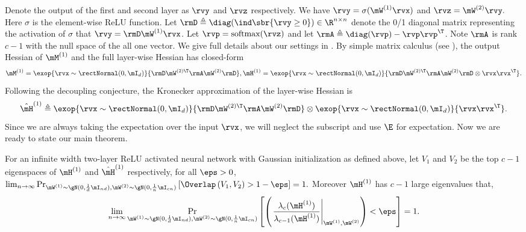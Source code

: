 Denote the output of the first and second layer as $\rvy$ and $\rvz$ respectively. We have $\rvy = \sigma(\mW^{(1)}\rvx)$ and $\rvz = \mW^{(2)}\rvy.$ Here $\sigma$ is the element-wise ReLU function.
Let $\rmD\triangleq\diag(\ind\sbr{\rvy\geq 0})\in\R^{n\times n}$ denote the 0/1 diagonal matrix representing the activation of $\sigma$ that $\rvy=\rmD\mW^{(1)}\rvx$.
Let $\rvp=\mbox{softmax}(\rvz)$ and let $\rmA\triangleq\diag(\rvp)-\rvp\rvp^\T$. Note $\rmA$ is rank $c-1$ with the null space of the all one vector.  We give full details about our settings in .
By simple matrix calculus (see ), the output Hessian of $\mM^{(1)}$ and the full layer-wise Hessian has closed-form
\begin{equation}
    \mM^{(1)} = \exop{\rvx\sim \rectNormal(0, \mI_d)}{\rmD\mW^{(2)\T}\rmA\mW^{(2)}\rmD}, \mH^{(1)} = \exop{\rvx\sim \rectNormal(0, \mI_d)}{\rmD\mW^{(2)\T}\rmA\mW^{(2)}\rmD\otimes \rvx\rvx^\T}.
\end{equation}
Following the decoupling conjecture, the Kronecker approximation of the layer-wise Hessian is \begin{equation}
    \hat\mH^{(1)} \triangleq \exop{\rvx\sim \rectNormal(0, \mI_d)}{\rmD\mW^{(2)\T}\rmA\mW^{(2)}\rmD}\otimes \exop{\rvx\sim \rectNormal(0, \mI_d)}{\rvx\rvx^\T}.
\end{equation}
Since we are always taking the expectation over the input $\rvx$, we will neglect the subscript and use $\E$ for expectation. Now we are ready to state our main theorem.

\begin{theorem}
\label{thm:main-full}
For an infinite width two-layer ReLU activated neural network with Gaussian initialization as defined above, let $V_1$ and $V_2$ be the top $c-1$ eigenspaces of $\mH^{(1)}$ and $\hat\mH^{(1)}$ respectively, for all $\eps>0$, 
$
    \lim_{n\to\infty}\mathop{\Pr}_{\mW^{(1)}\sim\gN(0,\frac{1}{d}\mI_{nd}), \mW^{(2)}\sim\gN(0,\frac{1}{n}\mI_{cn})}\left[\Overlap\left(V_1,V_2\right)>1-\eps\right] = 1.
$
Moreover $\mH^{(1)}$ has $c-1$ large eigenvalues that, \begin{equation}
    \lim_{n\to\infty}\mathop{\Pr}_{\mW^{(1)}\sim\gN(0,\frac{1}{d}\mI_{nd}), \mW^{(2)}\sim\gN(0,\frac{1}{n}\mI_{cn})}\left[\left(\left.\frac{\lambda_c(\mH^{(1)})}{\lambda_{c-1}(\mH^{(1)})}\right|_{\mW^{(1)}, \mW^{(2)}}\right) < \eps\right] = 1.
\end{equation}
\end{theorem}

